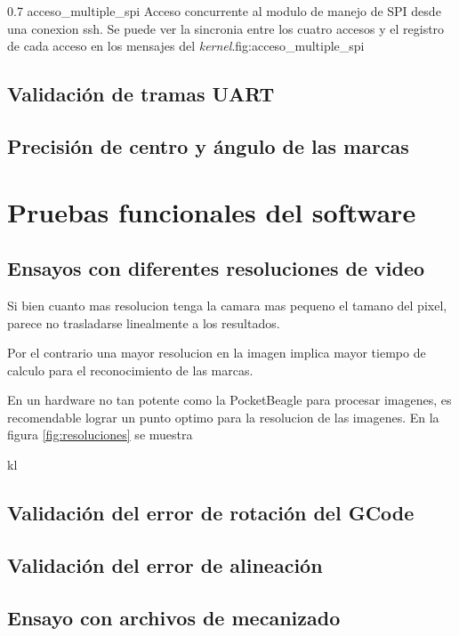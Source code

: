 \subfiga
{0.7} {acceso_multiple_spi} {Acceso concurrente al modulo de manejo de SPI desde una conexion ssh. Se puede ver la sincronia entre los cuatro accesos y el registro de cada acceso en los mensajes del \textit{kernel}.}{fig:acceso_multiple_spi}


\subsection{Validación de tramas UART}
\subsection{Precisión de centro y ángulo de las marcas}

\section{Pruebas funcionales del software}
\subsection{Ensayos con diferentes resoluciones de video}

Si bien cuanto mas resolucion tenga la camara mas pequeno el tamano del pixel, parece no
trasladarse linealmente a los resultados. \par
Por el contrario una mayor resolucion en la imagen implica mayor tiempo de calculo para el reconocimiento de las marcas.\par
En un hardware no tan potente como la PocketBeagle para procesar imagenes, es recomendable lograr un punto optimo para la resolucion de las imagenes.
En la figura \ref{fig:resoluciones} se muestra

kl

 



\subsection{Validación del error de rotación del GCode}
\subsection{Validación del error de alineación}
\subsection{Ensayo con archivos de mecanizado}

